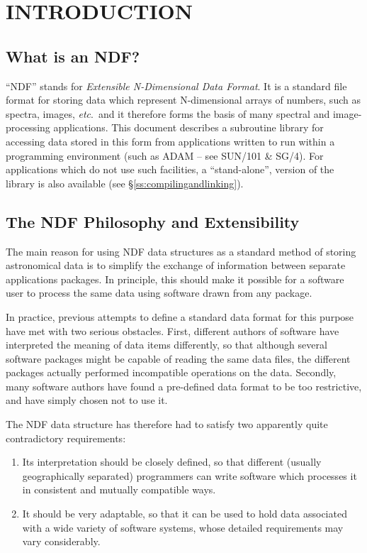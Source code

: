 \documentclass[twoside,11pt]{article}
\newcommand{\xref}[3]{#1}
\newcommand{\xlabel}[1]{}
\newcommand{\st}[1]{{\em{#1}}}
\begin{document}
\section{\xlabel{introduction}INTRODUCTION}

\subsection{\xlabel{what_is_an_ndf}What is an NDF?}

``NDF'' stands for \st{Extensible N-Dimensional Data Format}.  It is
a standard file format for storing data which represent N-dimensional
arrays of numbers, such as spectra, images, \st{etc}.\ and it
therefore forms the basis of many spectral and image-processing
applications.
This document describes a subroutine library for accessing data stored
in this form from applications written to run within a programming
environment (such as ADAM -- see \xref{SUN/101}{sun101}{} \&
\xref{SG/4}{sg4}{}).
For applications which do not use such facilities, a ``stand-alone'',
version of the library is also available (see
\S\ref{ss:compilingandlinking}).

\subsection{\xlabel{the_ndf_philosophy_and_extensibility}The NDF Philosophy and Extensibility}

The main reason for using NDF data structures as a standard method of
storing astronomical data is to simplify the exchange of information
between separate applications packages.  In principle, this should
make it possible for a software user to process the same data using
software drawn from any package.

In practice, previous attempts to define a standard data format for this
purpose have met with two serious obstacles. 
First, different authors of software have interpreted the meaning of data
items differently, so that although several software packages might be
capable of reading the same data files, the different packages actually
performed incompatible operations on the data. 
Secondly, many software authors have found a pre-defined data format to be
too restrictive, and have simply chosen not to use it. 

The NDF data structure has therefore had to satisfy two apparently quite
contradictory requirements: 

\begin{enumerate}

\item Its interpretation should be closely defined, so that different
(usually geographically separated) programmers can write software which
processes it in consistent and mutually compatible ways. 

\item It should be very adaptable, so that it can be used to hold data
associated with a wide variety of software systems, whose detailed
requirements may vary considerably. 

\end{enumerate}
\end{document}
